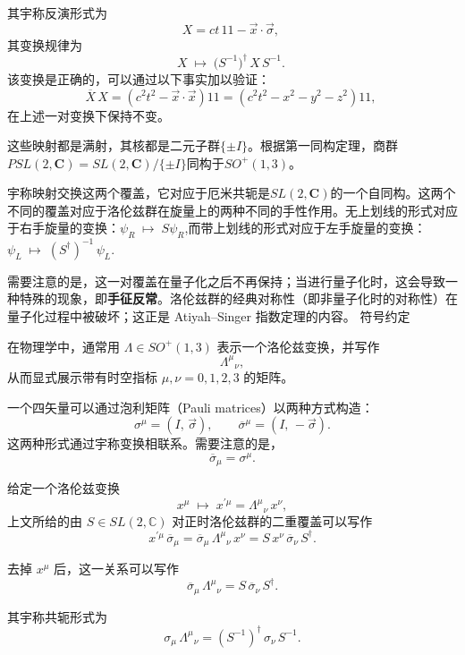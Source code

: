 其宇称反演形式为
\[
X = ct\,1\!\!1 - \vec{x}\cdot\vec{\sigma},~
\]
其变换规律为
\[
X \;\mapsto\; \bigl(S^{-1}\bigr)^{\dagger}\, X \, S^{-1}.~
\]
该变换是正确的，可以通过以下事实加以验证：
\[
\overline{X}\,X = \left(c^{2}t^{2} - \vec{x}\cdot \vec{x}\right)1\!\!1
= \left(c^{2}t^{2} - x^{2} - y^{2} - z^{2}\right)1\!\!1,~
\]
在上述一对变换下保持不变。

这些映射都是满射，其核都是二元子群$\{\pm I\}$。根据第一同构定理，商群$PSL(2,\mathbf{C}) = SL(2,\mathbf{C}) / \{\pm I\}$同构于$SO^{+}(1,3)$。

宇称映射交换这两个覆盖，它对应于厄米共轭是$SL(2,\mathbf{C})$的一个自同构。这两个不同的覆盖对应于洛伦兹群在旋量上的两种不同的手性作用。无上划线的形式对应于右手旋量的变换：$\psi_{R} \;\mapsto\; S \psi_{R}$,而带上划线的形式对应于左手旋量的变换：$\psi_{L} \;\mapsto\; (S^{\dagger})^{-1}\,\psi_{L}$.

需要注意的是，这一对覆盖在量子化之后不再保持；当进行量子化时，这会导致一种特殊的现象，即\textbf{手征反常}。洛伦兹群的经典对称性（即非量子化时的对称性）在量子化过程中被破坏；这正是 Atiyah–Singer 指数定理的内容。
符号约定

在物理学中，通常用 $\Lambda \in SO^{+}(1,3)$ 表示一个洛伦兹变换，并写作
\[
{\Lambda^{\mu}}_{\nu},
\]
从而显式展示带有时空指标 $\mu,\nu = 0,1,2,3$ 的矩阵。

一个四矢量可以通过泡利矩阵（Pauli matrices）以两种方式构造：
\[
\sigma^{\mu} = (I,\, \vec{\sigma}),
\qquad
\overline{\sigma}^{\mu} = (I,\, -\vec{\sigma}).
\]
这两种形式通过宇称变换相联系。需要注意的是，
\[
\overline{\sigma}_{\mu} = \sigma^{\mu}.
\]

给定一个洛伦兹变换
\[
x^{\mu} \;\mapsto\; x^{\prime \mu} = {\Lambda^{\mu}}_{\nu}\, x^{\nu},
\]
上文所给的由 $S \in SL(2,\mathbb{C})$ 对正时洛伦兹群的二重覆盖可以写作
\[
x^{\prime \mu}\,\overline{\sigma}_{\mu}
= \overline{\sigma}_{\mu}\,{\Lambda^{\mu}}_{\nu}\,x^{\nu}
= S \, x^{\nu}\,\overline{\sigma}_{\nu}\, S^{\dagger}.
\]

去掉 $x^{\mu}$ 后，这一关系可以写作
\[
\overline{\sigma}_{\mu}\,{\Lambda^{\mu}}_{\nu}
= S \,\overline{\sigma}_{\nu}\, S^{\dagger}.
\]

其宇称共轭形式为
\[
\sigma_{\mu}\,{\Lambda^{\mu}}_{\nu}
= \left(S^{-1}\right)^{\dagger}\,\sigma_{\nu}\,S^{-1}.
\]
